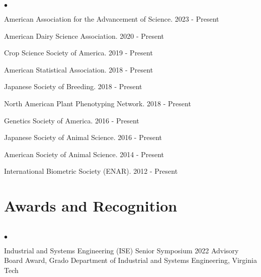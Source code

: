 \documentclass[margin,line,10pt]{res}
\newenvironment{list2}{
  \begin{list}{$\bullet$}{%
      \setlength{\itemsep}{0in}
      \setlength{\parsep}{0in} \setlength{\parskip}{0in}
      \setlength{\topsep}{0in} \setlength{\partopsep}{0in} 
      \setlength{\leftmargin}{0.2in}}}{\end{list}}
\begin{document}
\begin{resume}
\begin{list2}
  \item American Association for the Advancement of Science. 2023 - Present
  \vspace{0.3cm}
  \item American Dairy Science Association. 2020 - Present
    \vspace{0.3cm}
  \item Crop Science Society of America. 2019 - Present
    \vspace{0.3cm}
  \item American Statistical Association. 2018 - Present
    \vspace{0.3cm}
  \item  Japanese Society of Breeding. 2018 - Present
      \vspace{0.3cm}
\item North American Plant Phenotyping Network. 2018 - Present
  \vspace{0.3cm}
\item  Genetics Society of America. 2016 - Present
  \vspace{0.3cm}
\item  Japanese Society of Animal Science. 2016 - Present
  \vspace{0.3cm}
\item American Society of Animal Science. 2014 - Present
  \vspace{0.3cm}
\item International Biometric Society (ENAR). 2012 - Present
\end{list2}


\vspace{0.5cm}
\section{\sc Awards and Recognition}
\vspace{1cm}
\section{}
\begin{list2}
  \item Industrial and Systems Engineering (ISE) Senior Symposium 2022 Advisory Board Award, Grado Department of Industrial and Systems Engineering, Virginia Tech 
\end{list2}




\end{resume}
\end{document}
